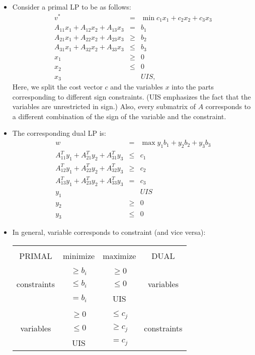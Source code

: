 \documentclass{article}
\begin{document}
\begin{itemize}
\item Consider a primal LP to be as follows:
\begin{eqnarray*}
v^* &= &\min c_1x_1+c_2x_2+c_3x_3\\
A_{11}x_1+A_{12}x_2+A_{13}x_3 &= &b_1\\
A_{21}x_1+A_{22}x_2+A_{23}x_3 &\ge &b_2\\
A_{31}x_1+A_{32}x_2+A_{33}x_3 &\le &b_3\\
x_1 &\ge &0\\
x_2 & \le &0\\
x_3 &&UIS,
\end{eqnarray*}
Here, we split the cost vector $c$ and the variables $x$ into the parts corresponding to different sign constraints. (UIS emphasizes the fact that the variables are unrestricted in sign.) Also, every submatrix of $A$ corresponds to a different combination of the sign of the variable and the constraint. 
\item The corresponding dual LP is:
\begin{eqnarray*}
w&=&\max y_1b_1+y_2b_2+y_3b_3 \\
A_{11}^Ty_1+A_{21}^Ty_2+A_{31}^Ty_3 &\le &c_1\\
A_{12}^Ty_1+A_{22}^Ty_2+A_{32}^Ty_3 &\ge &c_2\\
A_{13}^Ty_1+A_{23}^Ty_2+A_{33}^Ty_3 &= &c_3\\
y_1 &&UIS\\
y_2 &\ge &0\\
y_3 &\le &0
\end{eqnarray*}
\item In general, variable corresponds to constraint (and vice versa):\\
\begin{tabular}{|c|c|c|c|}
\hline&&&\\
PRIMAL & minimize & maximize & DUAL\\
\hline&&&\\
&$\ge b_i$ & $\ge 0$ & \\
constraints &$\le b_i$ & $\le 0$ & variables\\
&$= b_i$ & UIS &\\
\hline &&&\\
& $\ge 0$ & $\le c_j$ &\\
variables & $\le 0$ & $\ge c_j$ & constraints\\
& UIS & $= c_j$ &\\
\hline
\end{tabular}
\end{itemize}
\end{document}
